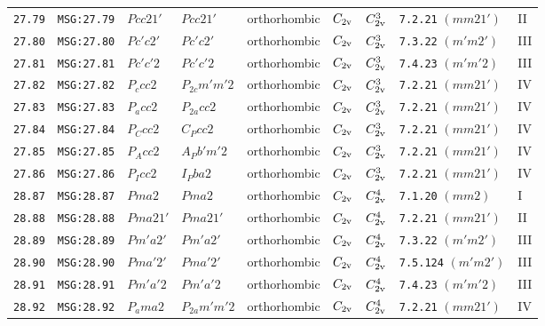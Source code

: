 \documentclass[fleqn,10pt]{jsarticle}
\begin{document}
\begin{center}
\begin{longtable}{lllllllll}
\texttt{27.79} & \texttt{MSG:27.79} & $Pcc21'$ & $Pcc21'$ & orthorhombic & $C_{\rm 2v}$ & $C_{\rm 2v}^{3}$ & \texttt{7.2.21} $(mm21')$ & II \\
\texttt{27.80} & \texttt{MSG:27.80} & $Pc'c2'$ & $Pc'c2'$ & orthorhombic & $C_{\rm 2v}$ & $C_{\rm 2v}^{3}$ & \texttt{7.3.22} $(m'm2')$ & III \\
\texttt{27.81} & \texttt{MSG:27.81} & $Pc'c'2$ & $Pc'c'2$ & orthorhombic & $C_{\rm 2v}$ & $C_{\rm 2v}^{3}$ & \texttt{7.4.23} $(m'm'2)$ & III \\
\texttt{27.82} & \texttt{MSG:27.82} & $P_{c}cc2$ & $P_{2c}m'm'2$ & orthorhombic & $C_{\rm 2v}$ & $C_{\rm 2v}^{3}$ & \texttt{7.2.21} $(mm21')$ & IV \\
\texttt{27.83} & \texttt{MSG:27.83} & $P_{a}cc2$ & $P_{2a}cc2$ & orthorhombic & $C_{\rm 2v}$ & $C_{\rm 2v}^{3}$ & \texttt{7.2.21} $(mm21')$ & IV \\
\texttt{27.84} & \texttt{MSG:27.84} & $P_{C}cc2$ & $C_{P}cc2$ & orthorhombic & $C_{\rm 2v}$ & $C_{\rm 2v}^{3}$ & \texttt{7.2.21} $(mm21')$ & IV \\
\texttt{27.85} & \texttt{MSG:27.85} & $P_{A}cc2$ & $A_{P}b'm'2$ & orthorhombic & $C_{\rm 2v}$ & $C_{\rm 2v}^{3}$ & \texttt{7.2.21} $(mm21')$ & IV \\
\texttt{27.86} & \texttt{MSG:27.86} & $P_{I}cc2$ & $I_{P}ba2$ & orthorhombic & $C_{\rm 2v}$ & $C_{\rm 2v}^{3}$ & \texttt{7.2.21} $(mm21')$ & IV \\ \hline
\texttt{28.87} & \texttt{MSG:28.87} & $Pma2$ & $Pma2$ & orthorhombic & $C_{\rm 2v}$ & $C_{\rm 2v}^{4}$ & \texttt{7.1.20} $(mm2)$ & I \\
\texttt{28.88} & \texttt{MSG:28.88} & $Pma21'$ & $Pma21'$ & orthorhombic & $C_{\rm 2v}$ & $C_{\rm 2v}^{4}$ & \texttt{7.2.21} $(mm21')$ & II \\
\texttt{28.89} & \texttt{MSG:28.89} & $Pm'a2'$ & $Pm'a2'$ & orthorhombic & $C_{\rm 2v}$ & $C_{\rm 2v}^{4}$ & \texttt{7.3.22} $(m'm2')$ & III \\
\texttt{28.90} & \texttt{MSG:28.90} & $Pma'2'$ & $Pma'2'$ & orthorhombic & $C_{\rm 2v}$ & $C_{\rm 2v}^{4}$ & \texttt{7.5.124} $(m'm2')$ & III \\
\texttt{28.91} & \texttt{MSG:28.91} & $Pm'a'2$ & $Pm'a'2$ & orthorhombic & $C_{\rm 2v}$ & $C_{\rm 2v}^{4}$ & \texttt{7.4.23} $(m'm'2)$ & III \\
\texttt{28.92} & \texttt{MSG:28.92} & $P_{a}ma2$ & $P_{2a}m'm'2$ & orthorhombic & $C_{\rm 2v}$ & $C_{\rm 2v}^{4}$ & \texttt{7.2.21} $(mm21')$ & IV \\

\end{longtable}
\end{center}
\end{document}
